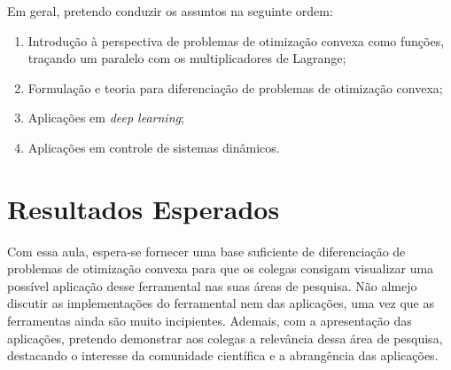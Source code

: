 \documentclass[a4paper]{report}
\begin{document}
Em geral, pretendo conduzir os assuntos na seguinte ordem:
\begin{enumerate}
    \item Introdução à perspectiva de problemas de otimização convexa como funções, traçando um paralelo com os multiplicadores de Lagrange;
    \item Formulação e teoria para diferenciação de problemas de otimização convexa;
    \item Aplicações em \emph{deep learning};
    \item Aplicações em controle de sistemas dinâmicos.
\end{enumerate}

\section*{Resultados Esperados}

Com essa aula, espera-se fornecer uma base suficiente de diferenciação de problemas de otimização convexa para que os colegas consigam visualizar uma possível aplicação desse ferramental nas suas áreas de pesquisa.
Não almejo discutir as implementações do ferramental nem das aplicações, uma vez que as ferramentas ainda são muito incipientes.
Ademais, com a apresentação das aplicações, pretendo demonstrar aos colegas a relevância dessa área de pesquisa, destacando o interesse da comunidade científica e a abrangência das aplicações.


\end{document}
